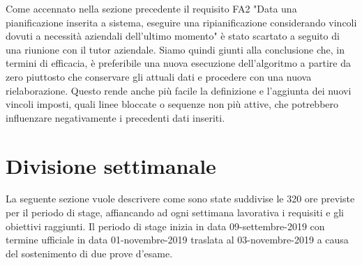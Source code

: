 Come accennato nella sezione precedente il requisito FA2 "Data una pianificazione inserita a sistema, eseguire una
ripianificazione considerando vincoli dovuti a necessità aziendali
dell’ultimo momento" è stato scartato a seguito di una riunione con il tutor aziendale. Siamo quindi giunti alla conclusione che, in termini di efficacia, è preferibile una nuova esecuzione dell'algoritmo a partire da zero piuttosto che conservare gli attuali dati e procedere con una nuova rielaborazione. Questo rende anche più facile la definizione e l'aggiunta dei nuovi vincoli imposti, quali linee bloccate o sequenze non più attive, che potrebbero influenzare negativamente i precedenti dati inseriti.


\section{Divisione settimanale}

La seguente sezione vuole descrivere come sono state suddivise le 320 ore previste per il periodo di stage, affiancando ad ogni settimana lavorativa i requisiti e gli obiettivi raggiunti. Il periodo di stage inizia in data 09-settembre-2019 con termine ufficiale in data 01-novembre-2019 traslata al 03-novembre-2019 a causa del sostenimento di due prove d'esame.


